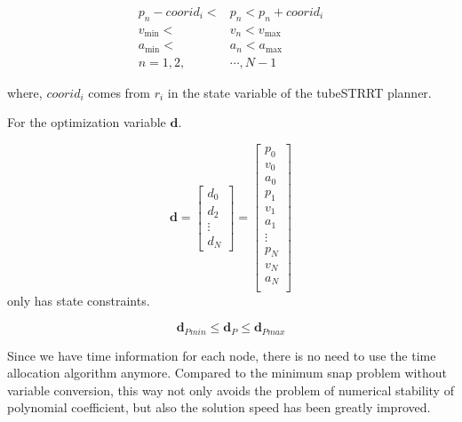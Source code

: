 \documentclass[conference]{IEEEtran}
\begin{document}
    \begin{equation}
        \begin{aligned}
            p_{n}-coorid_{i}<&p_n<p_{n}+coorid_{i}  \\
            v_{\min}<&v_n<v_{\max}  \\ 
            a_{\min}<&a_n<a_{\max}  \\ 
            n = 1,2,&\cdots,N-1
        \end{aligned}
    \end{equation}

    where, $coorid_{i}$ comes from $r_{i}$ in the state variable of the tubeSTRRT planner. 

    For the optimization variable $\boldsymbol{d}$.

    \begin{equation}
        \boldsymbol{d} = \begin{bmatrix}
            d_{0}  \\
            d_{2} \\
            \vdots \\
            d_{N}
            \end{bmatrix}
            = 
            \begin{bmatrix}
            p_{0} \\
            v_{0} \\
            a_{0} \\
            p_{1} \\
            v_{1} \\
            a_{1}  \\
            \vdots \\ 
            p_{N} \\
            v_{N} \\
            a_{N}  \\
        \end{bmatrix}
    \end{equation}
    only has state constraints.

    \begin{equation}
        \boldsymbol{d}_{Pmin} \leq \boldsymbol{d}_{P}  \leq \boldsymbol{d}_{Pmax}
    \end{equation}

    Since we have time information for each node, there is no need to use the time allocation algorithm anymore.
    Compared to the minimum snap problem without variable conversion, this way not only avoids the problem of numerical stability of polynomial coefficient, but also the solution speed has been greatly improved.
    
\end{document}
